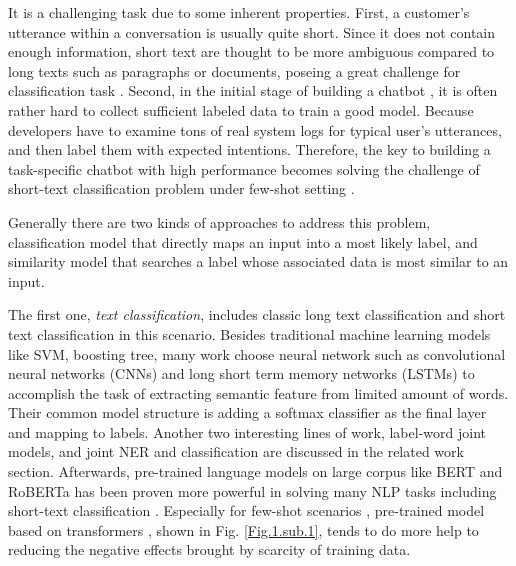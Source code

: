 \documentclass[letterpaper]{article} %
\begin{document}
  It  is  a  challenging task due to some inherent properties. First,
  a customer's  utterance  within  a conversation is usually quite short. Since it
  does  not  contain  enough  information,  short  text \cite{song2014short} are
  thought  to  be  more  ambiguous  compared to long texts such as paragraphs or
  documents,  poseing  a  great challenge \cite{chen2019deep} for classification
  task   \cite{phan2008learning,yan2009dynamic,hua2015short}.   Second,  in  the
  initial  stage  of  building  a  chatbot  , it is often rather hard to collect
  sufficient  labeled  data  to  train  a good model. Because developers have to
  examine tons of real system logs for typical user's utterances, and then label
  them  with expected intentions. Therefore, the key to building a task-specific
  chatbot  with  high  performance  becomes  solving the challenge of short-text
  classification   \cite{sriram2010short}   problem   under   few-shot   setting
  \cite{yu2018diverse}.


  Generally  there  are  two  kinds  of  approaches  to  address  this  problem,
  classification model that directly maps an input into a most likely label, and
  similarity  model  that searches a label whose associated data is most similar to
  an input.


  The   first  one,  \emph{text  classification},  includes  classic  long  text
  classification  and  short  text  classification  in  this  scenario.  Besides
  traditional  machine  learning  models  like  SVM,  boosting  tree,  many work
  \cite{wen2016network}  choose  neural  network  such  as  convolutional neural
  networks (CNNs) \cite{kim2014convolutional,zhang2015character,conneau2016very}
  and       long       short       term       memory       networks      (LSTMs)
  \cite{mousa2017contextual,liu2016recurrent}   to   accomplish   the   task  of
  extracting  semantic  feature from limited amount of words. Their common model
  structure  is  adding  a  softmax classifier as the final layer and mapping to
  labels.  Another  two  interesting lines of work, label-word joint models, and
  joint  NER  and  classification  are  discussed  in  the related work section.
  Afterwards,   pre-trained   language   models   on   large  corpus  like  BERT
  \cite{devlin2018bert}  and  RoBERTa \cite{liu2019roberta} has been proven more
  powerful  in  solving  many  NLP  tasks  including  short-text  classification
  \cite{madabushi2020cost}.      Especially      for      few-shot     scenarios
  \cite{yu2018diverse},     pre-trained     model    based    on    transformers
  \cite{vaswani2017attention}, shown in Fig. \ref{Fig.1.sub.1}, tends to do more
  help to reducing the negative effects brought by scarcity of training data.
\end{document}
